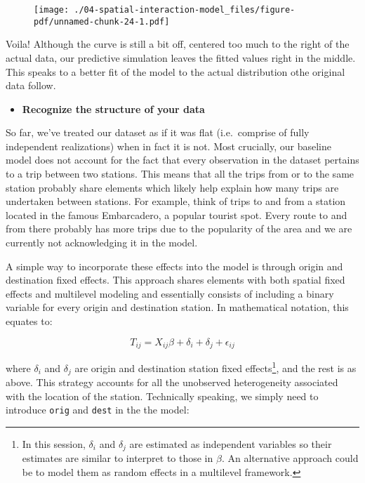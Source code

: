 \documentclass[
  letterpaper,
  krantz2]{style/krantz}
\providecommand{\tightlist}{%
  \setlength{\itemsep}{0pt}\setlength{\parskip}{0pt}}\usepackage{longtable,booktabs,array}
\begin{document}
\begin{figure}[H]

{\centering \texttt{[image: ./04-spatial-interaction-model\_files/figure-pdf/unnamed-chunk-24-1.pdf]}

}

\end{figure}

Voila! Although the curve is still a bit off, centered too much to the
right of the actual data, our predictive simulation leaves the fitted
values right in the middle. This speaks to a better fit of the model to
the actual distribution othe original data follow.

\begin{itemize}
\tightlist
\item
  \textbf{Recognize the structure of your data}
\end{itemize}

So far, we've treated our dataset as if it was flat (i.e.~comprise of
fully independent realizations) when in fact it is not. Most crucially,
our baseline model does not account for the fact that every observation
in the dataset pertains to a trip between two stations. This means that
all the trips from or to the same station probably share elements which
likely help explain how many trips are undertaken between stations. For
example, think of trips to and from a station located in the famous
Embarcadero, a popular tourist spot. Every route to and from there
probably has more trips due to the popularity of the area and we are
currently not acknowledging it in the model.

A simple way to incorporate these effects into the model is through
origin and destination fixed effects. This approach shares elements with
both spatial fixed effects and multilevel modeling and essentially
consists of including a binary variable for every origin and destination
station. In mathematical notation, this equates to:

\[
T_{ij} = X_{ij}\beta + \delta_i + \delta_j + \epsilon_{ij}
\]

where \(\delta_i\) and \(\delta_j\) are origin and destination station
fixed effects\footnote{In this session, \(\delta_i\) and \(\delta_j\)
  are estimated as independent variables so their estimates are similar
  to interpret to those in \(\beta\). An alternative approach could be
  to model them as random effects in a multilevel framework.}, and the
rest is as above. This strategy accounts for all the unobserved
heterogeneity associated with the location of the station. Technically
speaking, we simply need to introduce \texttt{orig} and \texttt{dest} in
the the model:
\end{document}
